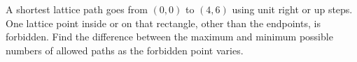 A shortest lattice path goes from $(0,0)$ to $(4,6)$ using unit right or up steps. One lattice point inside or on that rectangle, other than the endpoints, is forbidden. Find the difference between the maximum and minimum possible numbers of allowed paths as the forbidden point varies.
